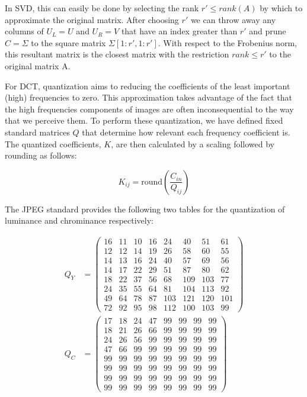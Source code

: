 \documentclass[review,onefignum,onetabnum]{siamart190516}
\begin{document}
In SVD, this can easily be done by selecting the rank $r' \leq rank(A)$ by which to 
approximate the original matrix. After choosing $r'$ we can throw away any columns
of $U_L = U$ and $U_R = V$ that have an index greater than $r'$ and prune $C = \Sigma$ to
the square matrix $\Sigma[1:r', 1:r']$. With respect to the Frobenius norm, this
resultant matrix is the closest matrix with the restriction $rank \leq r'$ to the 
original matrix A. \cite{trefethen1997numerical}

For DCT, quantization aims to reducing the coefficients of the least important (high)
frequencies to zero. This approximation takes advantage of the fact that the high
frequencies components of images are often inconsequential to the way that we
perceive them. To perform these quantization, we have defined fixed standard matrices 
$Q$ that determine how relevant each frequency coefficient is. The quantized coefficients, $K$,
are then calculated by a scaling followed by rounding as follows: 

\[
  K_{ij} = \text{round}(\frac{C_{in}}{Q_{ij}})
\]

The JPEG standard provides the following two tables for the quantization of luminance
and chrominance respectively: \cite{sangwine2012colour}

\begin{align*}
  Q_Y &= \begin{pmatrix}
    16&11&10&16&24&40&51&61 \\
    12&12&14&19&26&58&60&55 \\
    14&13&16&24&40&57&69&56 \\
    14&17&22&29&51&87&80&62 \\
    18&22&37&56&68&109&103&77 \\
    24&35&55&64&81&104&113&92 \\
    49&64&78&87&103&121&120&101 \\
    72&92&95&98&112&100&103&99
  \end{pmatrix} \\
  Q_C &= \begin{pmatrix}
    17&18&24&47&99&99&99&99 \\
    18&21&26&66&99&99&99&99 \\
    24&26&56&99&99&99&99&99 \\
    47&66&99&99&99&99&99&99 \\
    99&99&99&99&99&99&99&99 \\
    99&99&99&99&99&99&99&99 \\
    99&99&99&99&99&99&99&99 \\
    99&99&99&99&99&99&99&99
  \end{pmatrix}
\end{align*}
\end{document}
